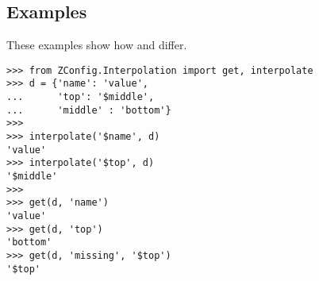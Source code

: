 \documentclass{howto}
\begin{document}
\subsection{Examples}

These examples show how  and 
differ.

\begin{verbatim}
>>> from ZConfig.Interpolation import get, interpolate
>>> d = {'name': 'value',
...      'top': '$middle',
...      'middle' : 'bottom'}
>>>
>>> interpolate('$name', d)
'value'
>>> interpolate('$top', d)
'$middle'
>>>
>>> get(d, 'name')
'value'
>>> get(d, 'top')
'bottom'
>>> get(d, 'missing', '$top')
'$top'
\end{verbatim}
\end{document}
